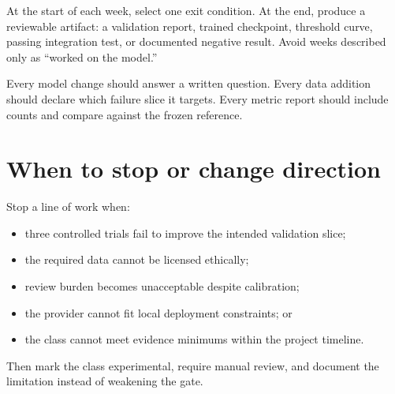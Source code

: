 At the start of each week, select one exit condition. At the end, produce a reviewable artifact: a validation report, trained checkpoint, threshold curve, passing integration test, or documented negative result. Avoid weeks described only as ``worked on the model.''

Every model change should answer a written question. Every data addition should declare which failure slice it targets. Every metric report should include counts and compare against the frozen reference.

\section{When to stop or change direction}

Stop a line of work when:

\begin{itemize}[leftmargin=6mm]
  \item three controlled trials fail to improve the intended validation slice;
  \item the required data cannot be licensed ethically;
  \item review burden becomes unacceptable despite calibration;
  \item the provider cannot fit local deployment constraints; or
  \item the class cannot meet evidence minimums within the project timeline.
\end{itemize}

Then mark the class experimental, require manual review, and document the limitation instead of weakening the gate.

